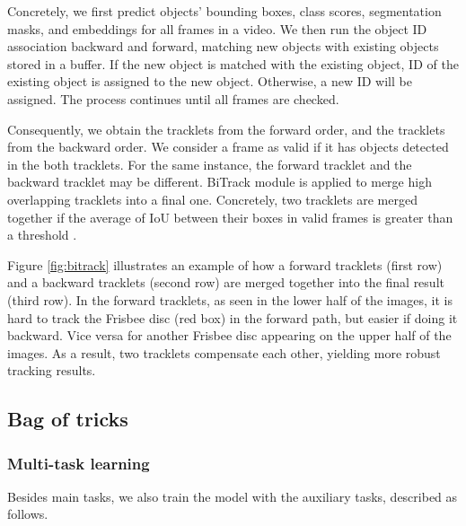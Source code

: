 \documentclass[10pt,twocolumn,letterpaper]{article}
\begin{document}
Concretely, we first predict objects' bounding boxes, class scores, segmentation masks, and embeddings for all frames in a video. We then run the object ID association backward and forward, matching new objects with existing objects stored in a buffer. If the new object is matched with the existing object, ID of the existing object is assigned to the new object. Otherwise, a new ID will be assigned. The process continues until all frames are checked. 

Consequently, we obtain the tracklets  from the forward order, and the tracklets  from the backward order. We consider a frame as valid if it has objects detected in the both tracklets. For the same instance, the forward tracklet  and the backward tracklet  may be different. BiTrack module is applied to merge high overlapping tracklets into a final one.  Concretely, two tracklets are merged together if the average of IoU between their boxes in valid frames is greater than a threshold . 

Figure \ref{fig:bitrack} illustrates an example of how a forward tracklets (first row) and a backward tracklets (second row) are merged together into the final result (third row). In the forward tracklets, as seen in the lower half of the images, it is hard to track the Frisbee disc (red box) in the forward path, but easier if doing it backward. Vice versa for another Frisbee disc appearing on the upper half of the images. As a result, two tracklets compensate each other, yielding more robust tracking results.
 


\subsection{Bag of tricks}
\label{sec:bag-of-tricks}

\subsubsection{Multi-task learning}
\label{multi-task-learning}
Besides main tasks, we also train the model with the auxiliary tasks, described as follows.
\end{document}
